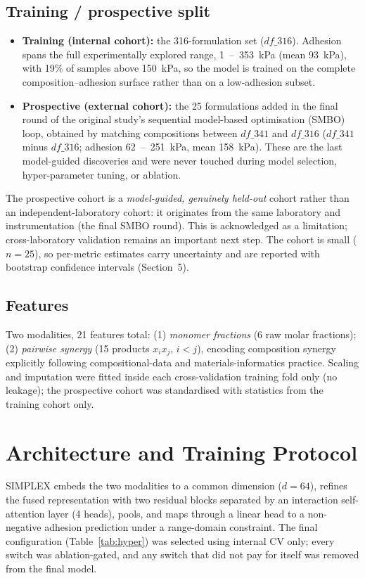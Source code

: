 \documentclass[utf8]{frontiers_suppmat}
\begin{document}
\subsection{Training / prospective split}
\begin{itemize}
\item \textbf{Training (internal cohort):} the 316-formulation set
  ($df\_316$). Adhesion spans the full experimentally explored range,
  1~--~353~kPa (mean 93~kPa), with 19\% of samples above 150~kPa, so the
  model is trained on the complete composition--adhesion surface rather than
  on a low-adhesion subset.
\item \textbf{Prospective (external cohort):} the 25 formulations added in
  the final round of the original study's sequential model-based optimisation
  (SMBO) loop, obtained by matching compositions between $df\_341$ and
  $df\_316$ ($df\_341$ minus $df\_316$; adhesion 62~--~251~kPa, mean
  158~kPa). These are the last model-guided discoveries and were never
  touched during model selection, hyper-parameter tuning, or ablation.
\end{itemize}
The prospective cohort is a \emph{model-guided, genuinely held-out} cohort
rather than an independent-laboratory cohort: it originates from the same
laboratory and instrumentation (the final SMBO round). This is acknowledged
as a limitation; cross-laboratory validation remains an important next step.
The cohort is small ($n=25$), so per-metric estimates carry uncertainty and
are reported with bootstrap confidence intervals (Section~5).

\subsection{Features}
Two modalities, 21 features total: (1) \emph{monomer fractions} (6 raw molar
fractions); (2) \emph{pairwise synergy} (15 products $x_i x_j$, $i<j$),
encoding composition synergy explicitly following compositional-data and
materials-informatics practice. Scaling and imputation were fitted inside
each cross-validation training fold only (no leakage); the prospective cohort
was standardised with statistics from the training cohort only.

\section{Architecture and Training Protocol}

SIMPLEX embeds the two modalities to a common dimension ($d=64$), refines the
fused representation with two residual blocks separated by an interaction
self-attention layer (4 heads), pools, and maps through a linear head to a
non-negative adhesion prediction under a range-domain constraint. The final
configuration (Table~\ref{tab:hyper}) was selected using internal CV only;
every switch was ablation-gated, and any switch that did not pay for itself
was removed from the final model.
\end{document}
